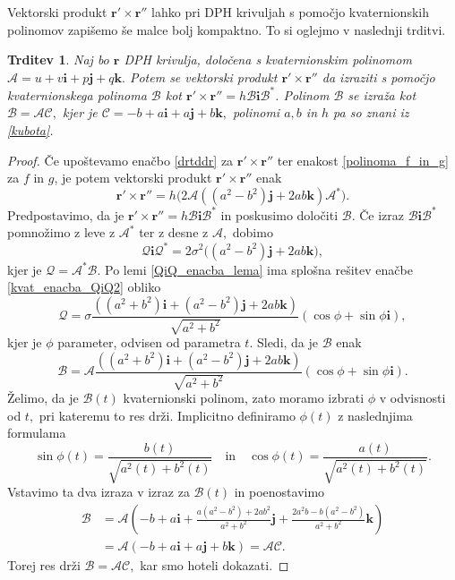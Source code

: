 \documentclass[12pt,a4paper,twoside]{article}
\theoremstyle{definition} %
\theoremstyle{plain} %
\newtheorem{trditev}[definicija]{Trditev}
\theoremstyle{primerstyle}
\numberwithin{equation}{section}  %
\newcommand{\rV}{\mathbf{r}}
\newcommand{\iV}{\mathbf{i}}
\newcommand{\jV}{\mathbf{j}}
\newcommand{\kV}{\mathbf{k}}
\newcommand{\AQ}{\mathcal{A}}
\newcommand{\BQ}{\mathcal{B}}
\newcommand{\CQ}{\mathcal{C}}
\newcommand{\QQ}{\mathcal{Q}}
\begin{document}
Vektorski produkt $\rV'\times\rV''$ lahko pri DPH krivuljah s pomočjo kvaternionskih polinomov zapišemo še malce bolj kompaktno. To si oglejmo v naslednji trditvi.
\begin{trditev}
	\label{drtddr_za_DPH}
	Naj bo $\rV$ DPH krivulja, določena s kvaternionskim polinomom $\AQ=u+v\iV+p\jV+q\kV.$ Potem se vektorski produkt $\rV'\times\rV''$ da izraziti s pomočjo kvaternionskega polinoma $\BQ$ kot $\rV'\times\rV''=h\BQ\iV\BQ^*$. Polinom $\BQ$ se izraža kot $\BQ=\AQ\CQ,$ kjer je $\CQ=-b+a\iV+a\jV+b\kV,$ polinomi $a,b$ in $h$ pa so znani iz \eqref{kubota}.
\end{trditev}
\begin{proof}
	Če upoštevamo enačbo \eqref{drtddr} za $\rV'\times\rV''$ ter enakost \eqref{polinoma_f_in_g} za $f$ in $g$, je potem vektorski produkt $\rV'\times\rV''$ enak
	\begin{equation}
		\rV'\times\rV''=h\big(2\AQ((a^2-b^2)\jV+2ab\kV)\AQ^*\big).
	\end{equation}
	Predpostavimo, da je $\rV'\times\rV''=h\BQ\iV\BQ^*$ in poskusimo določiti $\BQ.$ Če izraz $\BQ\iV\BQ^*$ pomnožimo z leve z $\AQ^*$ ter z desne z $\AQ,$ dobimo
	\begin{equation}
		\label{kvat_enacba_QiQ2}
		\QQ\iV\QQ^*=2\sigma^2\big((a^2-b^2)\jV+2ab\kV\big),
	\end{equation}
	kjer je $\QQ=\AQ^*\BQ.$ Po lemi \ref{QiQ_enacba_lema} ima splošna rešitev enačbe \eqref{kvat_enacba_QiQ2} obliko
	\begin{equation*}
		\QQ=\sigma\frac{((a^2+b^2)\iV+(a^2-b^2)\jV+2ab\kV)}{\sqrt{a^2+b^2}}(\cos\phi+\sin\phi\iV),
	\end{equation*}
	kjer je $\phi$ parameter, odvisen od parametra $t.$ Sledi, da je $\BQ$ enak
	\begin{equation*}
		\BQ=\AQ\frac{((a^2+b^2)\iV+(a^2-b^2)\jV+2ab\kV)}{\sqrt{a^2+b^2}}(\cos\phi+\sin\phi\iV).
	\end{equation*}
	Želimo, da je $\BQ(t)$ kvaternionski polinom, zato moramo izbrati  $\phi$ v odvisnosti od $t,$ pri kateremu to res drži. Implicitno definiramo $\phi(t)$ z naslednjima formulama
	\begin{equation*}
		\sin\phi(t)=\frac{b(t)}{\sqrt{a^2(t)+b^2(t)}}\quad\text{in}\quad\cos\phi(t)=\frac{a(t)}{\sqrt{a^2(t)+b^2(t)}}.
	\end{equation*}
	Vstavimo ta dva izraza v izraz za $\BQ(t)$ in poenostavimo
	\begin{align*}
		\BQ&=\AQ\left(-b+a\iV+\frac{a(a^2-b^2)+2ab^2}{a^2+b^2}\jV+\frac{2a^2b-b(a^2-b^2)}{a^2+b^2}\kV\right)\\
		&=\AQ(-b+a\iV+a\jV+b\kV)=\AQ\CQ.
	\end{align*}
	Torej res drži $\BQ=\AQ\CQ,$ kar smo hoteli dokazati.
\end{proof}
\end{document}
